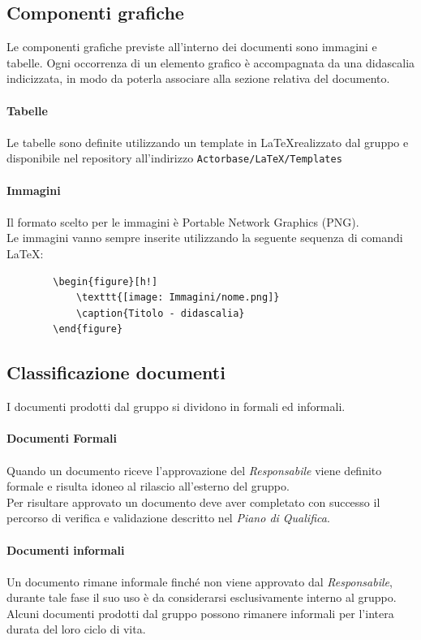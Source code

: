 \documentclass[a4paper]{report}
\begin{document}
	\subsection{Componenti grafiche}
	Le componenti grafiche previste all'interno dei documenti sono immagini e tabelle. Ogni occorrenza di un
	elemento grafico è accompagnata da una didascalia indicizzata, in modo da poterla associare alla sezione 
	relativa del documento. \\ \\
	\textbf{Tabelle} \\ \\ 
	Le tabelle sono definite utilizzando un template in \LaTeX \space realizzato dal gruppo e disponibile nel 
	repository all'indirizzo \verb|Actorbase/LaTeX/Templates| \\ \\ 
	\textbf{Immagini}  \\ \\
	Il formato scelto per le immagini è Portable Network Graphics (PNG). \\
	Le immagini vanno sempre inserite utilizzando la seguente sequenza di comandi \LaTeX:
	\begin{verbatim}
		\begin{figure}[h!]
			\texttt{[image: Immagini/nome.png]}
			\caption{Titolo - didascalia}
		\end{figure}
	\end{verbatim}
	\subsection{Classificazione documenti}
	I documenti prodotti dal gruppo si dividono in formali ed informali. \\ \\
	\textbf{Documenti Formali} \\ \\
	Quando un documento riceve l'approvazione del \emph{Responsabile} viene definito formale e risulta idoneo
	al rilascio all'esterno del gruppo. \\
	Per risultare approvato un documento deve aver completato con successo il percorso di verifica e validazione 
	descritto nel \emph{Piano di Qualifica}. \\ \\
	\textbf{Documenti informali} \\ \\
	Un documento rimane informale finché non viene approvato dal \emph{Responsabile}, durante tale fase 
	il suo uso è da considerarsi esclusivamente interno al gruppo. \\
	Alcuni documenti prodotti dal gruppo possono rimanere informali per l'intera durata del loro ciclo di vita.
\end{document}
